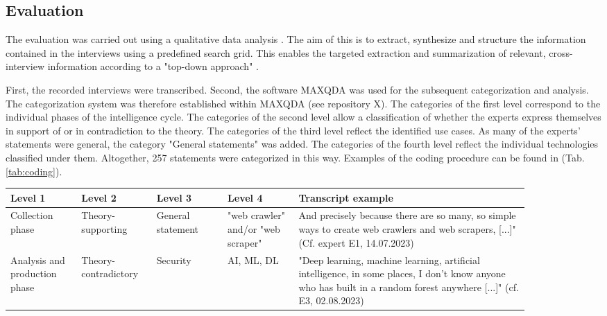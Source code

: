 \documentclass[10pt]{article}
\begin{document}
\subsection{Evaluation}

The evaluation was carried out using a qualitative data analysis \cite{Glaser.2009}.
The aim of this is to extract,
synthesize and structure the information contained in the interviews
using a predefined search grid. This enables the targeted
extraction and summarization of relevant, cross-interview information
according to a "top-down approach" \cite{Bogner.2014, Glaser.2009}.

First, the recorded interviews were transcribed. Second, the software
MAXQDA \cite{MAXQDA.19.07.2023} was used for the subsequent categorization and analysis.
The categorization system was therefore established within MAXQDA
(see repository X). The categories of the first level correspond to
the individual phases of the intelligence cycle. The categories of the
second level allow a classification of whether the experts express
themselves in support of or in contradiction to the theory. The
categories of the third level reflect the identified use cases.
As many of the experts' statements were general, the
category "General statements" was added. The categories
of the fourth level reflect the individual technologies classified
under them. Altogether, 257 statements were categorized in this way. Examples of the coding
procedure can be found in (Tab. \ref{tab:coding}).

\begin{table*}[htbp]
    \caption{Coding examples}
    \label{tab:coding}
    \begin{tabular*}{\textwidth}{|p{0.12\linewidth}|p{0.12\linewidth}|p{0.12\linewidth}|p{0.12\linewidth}|p{0.39\linewidth}|}
        \hline
        \textbf{Level 1} & \textbf{Level 2} & \textbf{Level 3} & \textbf{Level 4} & \textbf{Transcript example} \\
        \hline
        Collection phase & Theory- supporting & General statement & "web crawler" and/or "web scraper" & And precisely because there are so many, so simple ways to create web crawlers and web scrapers, [...]"(Cf. expert E1, 14.07.2023) \\
        \hline
        Analysis and production phase & Theory- contradictory & Security & AI, ML, DL & "Deep learning, machine learning, artificial intelligence, in some places, I don't know anyone who has built in a random forest anywhere [...]" (cf. E3, 02.08.2023) \\
        \hline
    \end{tabular*}
\end{table*}
\end{document}
